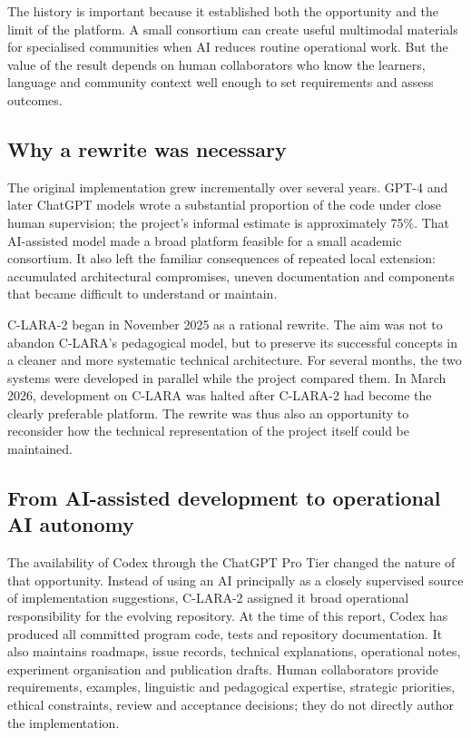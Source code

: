 The history is important because it established both the opportunity and the
limit of the platform. A small consortium can create useful multimodal
materials for specialised communities when AI reduces routine operational
work. But the value of the result depends on human collaborators who know the
learners, language and community context well enough to set requirements and
assess outcomes.

\subsection{Why a rewrite was necessary}

The original implementation grew incrementally over several years. GPT-4 and
later ChatGPT models wrote a substantial proportion of the code under close
human supervision; the project's informal estimate is approximately 75\%.
That AI-assisted model made a broad platform feasible for a small academic
consortium. It also left the familiar consequences of repeated local
extension: accumulated architectural compromises, uneven documentation and
components that became difficult to understand or maintain.

C-LARA-2 began in November 2025 as a rational rewrite. The aim was not to
abandon C-LARA's pedagogical model, but to preserve its successful concepts
in a cleaner and more systematic technical architecture. For several months,
the two systems were developed in parallel while the project compared them.
In March 2026, development on C-LARA was halted after C-LARA-2 had become the
clearly preferable platform. The rewrite was thus also an opportunity to
reconsider how the technical representation of the project itself could be
maintained.

\subsection{From AI-assisted development to operational AI autonomy}

The availability of Codex through the ChatGPT Pro Tier changed the nature of
that opportunity. Instead of using an AI principally as a closely supervised
source of implementation suggestions, C-LARA-2 assigned it broad operational
responsibility for the evolving repository. At the time of this report, Codex
has produced all committed program code, tests and repository documentation.
It also maintains roadmaps, issue records, technical explanations, operational
notes, experiment organisation and publication drafts. Human collaborators
provide requirements, examples, linguistic and pedagogical expertise,
strategic priorities, ethical constraints, review and acceptance decisions;
they do not directly author the implementation.

